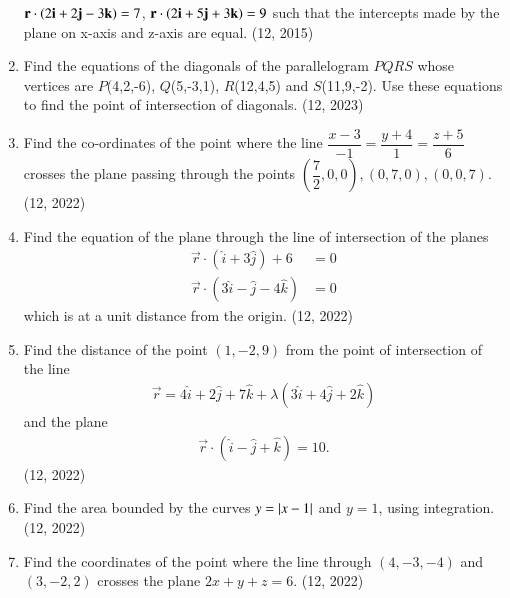 \begin{enumerate}[label=\thesubsection.\arabic*, ref=\thesubsection.\theenumi]
$\mathbf{r}\cdot\left(2\mathbf{i}+2\mathbf{j}-3\mathbf{k}\right)=7$, \quad $\mathbf{r}\cdot\left(2\mathbf{i}+5\mathbf{j}+3\mathbf{k}\right)=9$
such that the intercepts made by the plane on x-axis and z-axis are equal. \hfill (12, 2015)
\item Find the equations of the diagonals of the parallelogram $PQRS$ whose vertices are $P$(4,2,-6), $Q$(5,-3,1), $R$(12,4,5) and $S$(11,9,-2). Use these equations to find the point of intersection of diagonals. \hfill (12, 2023)
\item Find the co-ordinates of the point where the line $\dfrac{x-3}{-1}=\dfrac{y+4}{1}=\dfrac{z+5}{6}$ crosses the plane passing through the points $\left(\dfrac{7}{2},0,0\right),(0,7,0),(0,0,7)$. \hfill (12, 2022)

\item Find the equation of the plane through the line of intersection of the planes
	\begin{align}
		\vec{r}\cdot(\hat{i}+3\hat{j})+6&=0\\
		\vec{r}\cdot(3\hat{i}-\hat{j}-4\hat{k})&=0
	\end{align}
	which is at a unit distance from the origin. \hfill (12, 2022)
\item Find the distance of the point $(1,-2, 9)$ from the point of intersection of the line
	\begin{align}
		\vec{r}=4\hat{i}+2\hat{j}+7\hat{k}+\lambda(3\hat{i}+4\hat{j}+2\hat{k})
	\end{align}
	and the plane
	\begin{align}
		\vec{r}\cdot(\hat{i}-\hat{j}+\hat{k})=10.
	\end{align}
\hfill (12, 2022)

\item Find the area bounded by the curves $y=\left\vert x-1\right\vert$ and $y=1$, using integration. \hfill (12, 2022)

\item Find the coordinates of the point where the line through $(4,-3,-4)$ and $(3,-2,2)$ crosses the plane $2x+y+z=6$. \hfill (12, 2022)

\end{enumerate}
